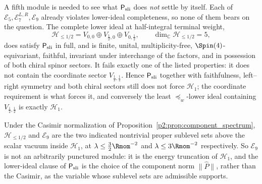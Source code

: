 \documentclass[11pt,a4paper]{article}
\begin{document}
\begin{proposition}
A fifth module is needed to see what \(\mathsf P_{\rm sli}\) does
\emph{not} settle by itself.  Each of
\(\mathcal E_5,\mathcal E_7^{L,R},\mathcal E_9\) already violates
lower-ideal completeness, so none of them bears on the question.  The
complete lower ideal at half-integral terminal weight,
\[
 \mathcal H_{\le1/2}
 =
 V_{0,0}\oplus V_{\frac12,0}\oplus V_{0,\frac12},
 \qquad
 \dim_{\mathbb C}\mathcal H_{\le1/2}=5,
\]
does satisfy \(\mathsf P_{\rm sli}\) in full, and is finite, unital,
multiplicity-free, \(\Spin(4)\)-equivariant, faithful, invariant under
interchange of the factors, and in possession of both chiral spinor sectors.
It fails exactly one of the listed properties: it does not contain the
coordinate sector \(V_{\frac12,\frac12}\).  Hence
\(\mathsf P_{\rm sli}\) together with faithfulness, left--right symmetry and
both chiral sectors still does not force \(\mathcal H_1\); the coordinate
requirement is what forces it, and conversely the least
\(\preceq_w\)-lower ideal containing \(V_{\frac12,\frac12}\) is exactly
\(\mathcal H_1\).

Under the Casimir normalization of
Proposition~\ref{p2:prop:component_spectrum}, \(\mathcal H_{\le1/2}\) and
\(\mathcal E_9\) are the two indicated nontrivial proper sublevel sets above
the scalar vacuum inside \(\mathcal H_1\), at
\(\lambda\le\tfrac32\Rmom^{-2}\) and \(\lambda\le3\Rmom^{-2}\)
respectively.  So \(\mathcal E_9\) is not an
arbitrarily punctured module: it is the energy truncation of
\(\mathcal H_1\), and the lower-ideal clause of \(\mathsf P_{\rm sli}\) is
the choice of the component norm \(\|\hat P\|\), rather than the Casimir, as
the variable whose sublevel sets are admissible supports.
\end{proposition}
\end{document}
